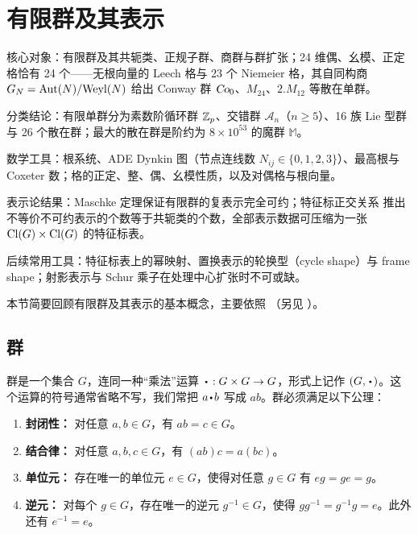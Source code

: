 \section{有限群及其表示}

\begin{keytakeaways}
  \item 核心对象：有限群及其共轭类、正规子群、商群与群扩张；24 维偶、幺模、正定格恰有 24 个——无根向量的 Leech 格与 23 个 Niemeier 格，其自同构商 $G_N=\operatorname{\text{Aut}}(N)/{\rm Weyl}(N)$  给出 Conway 群 $\operatorname{\textsl{Co}}_0$、$M_{24}$、$2.M_{12}$ 等散在单群。
  \item 分类结论：有限单群分为素数阶循环群 $\mathbb{Z}_p$、交错群 $\mathcal{A}_n$（$n\geq5$）、16 族 Lie 型群与 26 个散在群；最大的散在群是阶约为 $8\times10^{53}$ 的魔群 $\mathbb M$。
  \item 数学工具：根系统、ADE Dynkin 图（节点连线数 $N_{ij}\in\lbrace0,1,2,3\rbrace$）、最高根与 Coxeter 数；格的正定、整、偶、幺模性质，以及对偶格与根向量。
  \item 表示论结果：Maschke 定理保证有限群的复表示完全可约；特征标正交关系  推出不等价不可约表示的个数等于共轭类的个数，全部表示数据可压缩为一张 $\text{Cl}(G)\times\text{Cl}(G)$ 的特征标表。
  \item 后续常用工具：特征标表上的幂映射、置换表示的轮换型（cycle shape）与 frame shape；射影表示与 Schur 乘子在处理中心扩张时不可或缺。
\end{keytakeaways}

本节简要回顾有限群及其表示的基本概念，主要依照 \cite{HamermeshMorton1962Gtai,JonesH.F.HughF.1998Grap,webb_2016}（另见 \cite{2009arXiv0901.0827E}）。

\subsection{群}
\label{subsec:Groups}

群是一个集合 $G$，连同一种“乘法”运算 $\bcdot:G\times G\rightarrow G$，形式上记作 $(G,\bcdot)$。这个运算的符号通常省略不写，我们常把 $a\bcdot b$ 写成 $ab$。群必须满足以下公理：
\begin{enumerate}
\item \textbf{封闭性：} 对任意 $a,b\in G$，有 $ab=c\in G$。
\item \textbf{结合律：} 对任意 $a,b,c\in G$，有 $(ab)c=a(bc)$。
\item \textbf{单位元：} 存在唯一的单位元 $e\in G$，使得对任意 $g\in G$ 有 $eg=ge=g$。
\item \textbf{逆元：} 对每个 $g\in G$，存在唯一的逆元 $g^{-1}\in G$，使得 $gg^{-1}=g^{-1}g=e$。此外还有 $e^{-1}=e$。
\end{enumerate}

